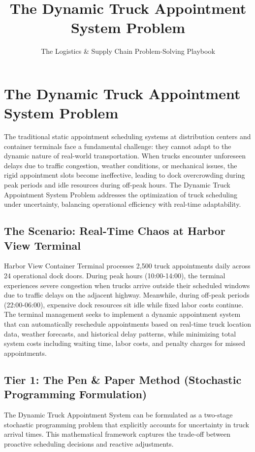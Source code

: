 \documentclass{article}
\title{The Dynamic Truck Appointment System Problem}
\author{The Logistics \& Supply Chain Problem-Solving Playbook}
\date{}
\begin{document}
\maketitle

\section{The Dynamic Truck Appointment System Problem}

The traditional static appointment scheduling systems at distribution centers and container terminals face a fundamental challenge: they cannot adapt to the dynamic nature of real-world transportation. When trucks encounter unforeseen delays due to traffic congestion, weather conditions, or mechanical issues, the rigid appointment slots become ineffective, leading to dock overcrowding during peak periods and idle resources during off-peak hours. The Dynamic Truck Appointment System Problem addresses the optimization of truck scheduling under uncertainty, balancing operational efficiency with real-time adaptability.

\subsection{The Scenario: Real-Time Chaos at Harbor View Terminal}

Harbor View Container Terminal processes 2,500 truck appointments daily across 24 operational dock doors. During peak hours (10:00-14:00), the terminal experiences severe congestion when trucks arrive outside their scheduled windows due to traffic delays on the adjacent highway. Meanwhile, during off-peak periods (22:00-06:00), expensive dock resources sit idle while fixed labor costs continue. The terminal management seeks to implement a dynamic appointment system that can automatically reschedule appointments based on real-time truck location data, weather forecasts, and historical delay patterns, while minimizing total system costs including waiting time, labor costs, and penalty charges for missed appointments.

\subsection{Tier 1: The Pen \& Paper Method (Stochastic Programming Formulation)}

The Dynamic Truck Appointment System can be formulated as a two-stage stochastic programming problem that explicitly accounts for uncertainty in truck arrival times. This mathematical framework captures the trade-off between proactive scheduling decisions and reactive adjustments.
\end{document}
